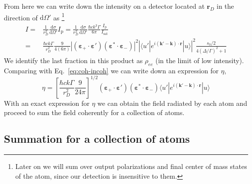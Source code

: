 \documentclass[11pt,letter]{article}
\newcommand{\bv}[1]{\ensuremath{\bm{#1}}}
\begin{document}
From here we can write down the intensity on a detector located at $\bv{r}_{D}$
in the direction of $\mathrm{d} \Omega'$ as \footnote{Later on we will sum over
output polarizations and final center of mass states of the atom, since our
detection is insensitive to them.}
\begin{equation}
\begin{split}
I  =& \frac{1}{r_{D}^{2}} \frac{ \mathrm{d} \sigma } { \mathrm{d} \Omega'}
      I_{\mathrm{p}} 
   =  \frac{1}{r_{D}^{2}} \frac{ \mathrm{d} \sigma } { \mathrm{d} \Omega'}
      \frac{\hbar c k^{3}\Gamma}{6 \pi} 
      \frac{ I_{\mathrm{p}}}{I_{\mathrm{sat}}}  \\ 
   =& \frac{\hbar c k \Gamma}{r_{D}^{2}}  
    \frac{9}{4 (6\pi)} 
        |(\bv{\varepsilon}_{+}\cdot \bv{\varepsilon}' )
                       (\bv{\varepsilon}^{*}\cdot \bv{\varepsilon}_{-} ) |^{2}
    \left|
      \langle u' | e^{i(\bv{k}'-\bv{k}) \cdot\bv{r}} | u  \rangle
  \right| ^{2}
     \frac{ s_{0}/2   }
        { 4(\Delta/\Gamma)^{2} + 1 }
\end{split}
\end{equation}
We identify the last fraction in this product as $\rho_{ee}$ (in the limit of
low intensity). Comparing with Eq.~\ref{eq:coh-incoh} we can write down an
expression for $\eta$, 
\begin{equation}
  \eta = \left[ \frac{\hbar c k \Gamma}{r_{D}^{2}}  
    \frac{9}{24\pi} \right]^{1/2} 
        (\bv{\varepsilon}_{+}\cdot \bv{\varepsilon}' )
                       (\bv{\varepsilon}^{*}\cdot \bv{\varepsilon}_{-} ) 
      \langle u' | e^{i(\bv{k}'-\bv{k}) \cdot\bv{r}} | u  \rangle
\end{equation}
With an exact expression for $\eta$ we can obtain the field radiated by each
atom and proceed to sum the field coherently for a collection of atoms. 

\subsection{Summation for a collection of atoms} 
\end{document}
